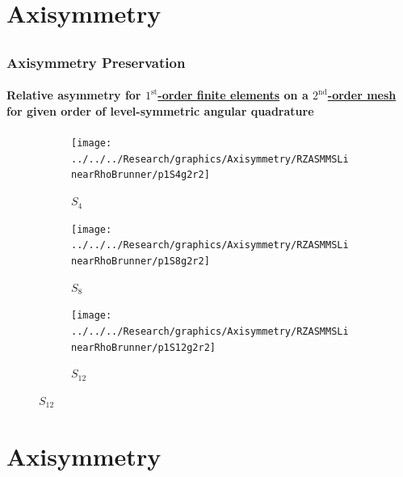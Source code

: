 \documentclass[compress,t]{beamer}
\begin{document}
\section{Axisymmetry}
\subsection{}

\begin{frame}
\frametitle{Axisymmetry Preservation}
\framesubtitle{Relative asymmetry for \underline{$1^\text{st}$-order finite elements} on a \underline{$2^\text{nd}$-order mesh} for given order of level-symmetric angular quadrature}

\begin{figure}
\centering
\begin{subfigure}{0.33\textwidth}
\centering
\texttt{[image: ../../../Research/graphics/Axisymmetry/RZASMMSLinearRhoBrunner/p1S4g2r2]}
\caption{$S_4$}
\end{subfigure}%
\begin{subfigure}{0.33\textwidth}
\centering
\texttt{[image: ../../../Research/graphics/Axisymmetry/RZASMMSLinearRhoBrunner/p1S8g2r2]}
\caption{$S_8$}
\end{subfigure}%
\begin{subfigure}{0.33\textwidth}
\centering
\texttt{[image: ../../../Research/graphics/Axisymmetry/RZASMMSLinearRhoBrunner/p1S12g2r2]}
\caption{$S_{12}$}
\end{subfigure}
\end{figure}

\end{frame}

\section{Axisymmetry}
\subsection{}
\end{document}

